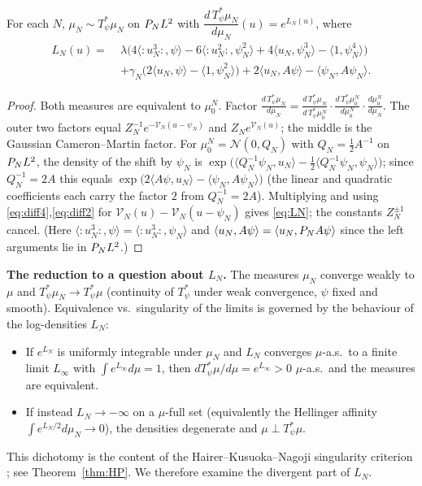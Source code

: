 \begin{qonelemma}\label{lem:density}
For each $N$, $\mu_N\sim T_\psi^*\mu_N$ on $P_N L^2$ with
$\dfrac{d\,T_\psi^*\mu_N}{d\mu_N}(u)=e^{L_N(u)}$, where
\begin{equation}\label{eq:LN}
\begin{aligned}
L_N(u)=\;&\lambda\bigl(4\langle{:}u_N^3{:},\psi\rangle-6\langle{:}u_N^2{:},\psi_N^2\rangle+4\langle u_N,\psi_N^3\rangle-\langle1,\psi_N^4\rangle\bigr)\\
&+\gamma_N\bigl(2\langle u_N,\psi\rangle-\langle1,\psi_N^2\rangle\bigr)+2\langle u_N,A\psi\rangle-\langle\psi_N,A\psi_N\rangle .
\end{aligned}
\end{equation}
\end{qonelemma}
\begin{proof}
Both measures are equivalent to $\mu_0^N$. Factor
$\frac{d\,T_\psi^*\mu_N}{d\mu_N}=\frac{d\,T_\psi^*\mu_N}{d\,T_\psi^*\mu_0^N}\cdot\frac{d\,T_\psi^*\mu_0^N}{d\mu_0^N}\cdot\frac{d\mu_0^N}{d\mu_N}$.
The outer two factors equal $Z_N^{-1}e^{-\mathcal V_N(u-\psi_N)}$ and
$Z_Ne^{\mathcal V_N(u)}$; the middle is the Gaussian Cameron--Martin factor. For
$\mu_0^N=\mathcal N(0,Q_N)$ with $Q_N=\tfrac12A^{-1}$ on $P_N L^2$, the density of the
shift by $\psi_N$ is
$\exp\bigl(\langle Q_N^{-1}\psi_N,u_N\rangle-\tfrac12\langle Q_N^{-1}\psi_N,\psi_N\rangle\bigr)$;
since $Q_N^{-1}=2A$ this equals
$\exp\bigl(2\langle A\psi,u_N\rangle-\langle\psi_N,A\psi_N\rangle\bigr)$ (the linear and
quadratic coefficients each carry the factor $2$ from $Q_N^{-1}=2A$).
Multiplying and using \eqref{eq:diff4},\eqref{eq:diff2} for
$\mathcal V_N(u)-\mathcal V_N(u-\psi_N)$ gives \eqref{eq:LN}; the constants $Z_N^{\pm1}$
cancel. (Here $\langle{:}u_N^3{:},\psi\rangle=\langle{:}u_N^3{:},\psi_N\rangle$ and
$\langle u_N,A\psi\rangle=\langle u_N,P_N A\psi\rangle$ since the left arguments lie
in $P_N L^2$.)
\end{proof}

\noindent\textbf{The reduction to a question about $L_N$.} The measures $\mu_N$
converge weakly to $\mu$ and $T_\psi^*\mu_N\to T_\psi^*\mu$ (continuity of $T_\psi^*$
under weak convergence, $\psi$ fixed and smooth). Equivalence vs.\ singularity of the
limits is governed by the behaviour of the log-densities $L_N$:
\begin{itemize}
\item If $e^{L_N}$ is uniformly integrable under $\mu_N$ and $L_N$ converges
$\mu$-a.s.\ to a finite limit $L_\infty$ with $\int e^{L_\infty}d\mu=1$, then
$dT_\psi^*\mu/d\mu=e^{L_\infty}>0$ $\mu$-a.s.\ and the measures are equivalent.
\item If instead $L_N\to-\infty$ on a $\mu$-full set (equivalently the Hellinger affinity
$\int e^{L_N/2}d\mu_N\to0$), the densities degenerate and $\mu\perp T_\psi^*\mu$.
\end{itemize}
This dichotomy is the content of the Hairer--Kusuoka--Nagoji singularity criterion
\cite{HKN24}; see Theorem~\ref{thm:HP}. We therefore examine the divergent part of
$L_N$.

